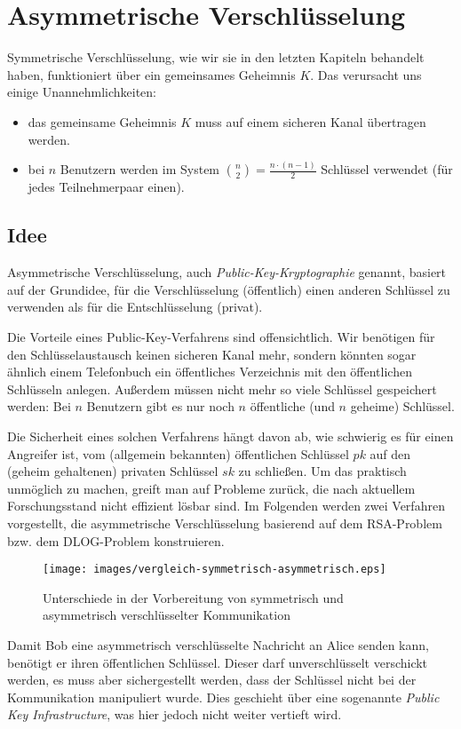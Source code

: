 \chapter{Asymmetrische Verschlüsselung}
\label{ch:asymmenc}

Symmetrische Verschlüsselung, wie wir sie in den letzten Kapiteln
behandelt haben, funktioniert über ein gemeinsames Geheimnis $K$.  Das
verursacht uns einige Unannehmlichkeiten:

\begin{itemize}
\item das gemeinsame Geheimnis $K$ muss auf einem sicheren Kanal
  übertragen werden.
\item bei $n$ Benutzern werden im System $\binom{n}{2} = \frac{n \cdot
    (n-1)}{2}$ Schlüssel verwendet (für jedes Teilnehmerpaar einen).
\end{itemize}

\section{Idee} Asymmetrische Verschlüsselung\indexEncryptionAsymm, auch
\emph{Public-Key-Kryptographie} genannt, basiert auf der Grundidee, für
die Verschlüsselung (öffentlich) einen anderen Schlüssel zu verwenden
als für die Entschlüsselung (privat).

Die Vorteile eines Public-Key-Verfahrens sind offensichtlich. Wir
benötigen für den Schlüsselaustausch keinen sicheren Kanal mehr, sondern
könnten sogar ähnlich einem Telefonbuch ein öffentliches Verzeichnis mit
den öffentlichen Schlüsseln anlegen. Außerdem müssen nicht mehr so viele
Schlüssel gespeichert werden: Bei $n$ Benutzern gibt es nur noch $n$
öffentliche (und $n$ geheime) Schlüssel.

Die Sicherheit eines solchen Verfahrens hängt davon ab, wie schwierig es
für einen Angreifer ist, vom (allgemein bekannten) öffentlichen
Schlüssel $pk$ auf den (geheim gehaltenen) privaten Schlüssel $sk$ zu
schließen. Um das praktisch unmöglich zu machen, greift man auf Probleme
zurück, die nach aktuellem Forschungsstand nicht effizient lösbar
sind. Im Folgenden werden zwei Verfahren vorgestellt, die asymmetrische
Verschlüsselung basierend auf dem RSA-Problem bzw. dem DLOG-Problem
konstruieren.

\begin{figure}
  \texttt{[image: images/vergleich-symmetrisch-asymmetrisch.eps]}
  \caption{Unterschiede in der Vorbereitung von symmetrisch und
    asymmetrisch verschlüsselter Kommunikation}
  \label{fig:asymmenc-symmenc}
\end{figure} Damit Bob eine asymmetrisch verschlüsselte Nachricht an
Alice senden kann, benötigt er ihren öffentlichen Schlüssel. Dieser darf
unverschlüsselt verschickt werden, es muss aber sichergestellt werden,
dass der Schlüssel nicht bei der Kommunikation manipuliert wurde. Dies
geschieht über eine sogenannte \textit{Public Key Infrastructure}, was
hier jedoch nicht weiter vertieft wird.
